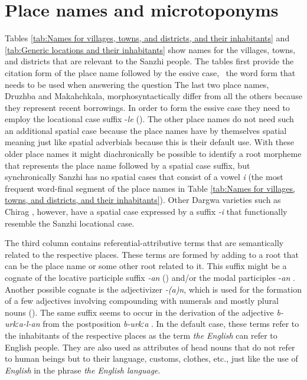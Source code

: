 \chapter{Place names and microtoponyms}
\label{cpt:morph-placenames}

Tables \ref{tab:Names for villages, towns, and districts, and their inhabitants} and \ref{tab:Generic locations and their inhabitants} show names for the villages, towns, and districts that are relevant to the Sanzhi people. The tables first provide the citation form of the place name followed by the essive case, \tie\ the word form that needs to be used when answering the question  The last two place names, Druzhba and Makahchkala, morphosyntactically differ from all the others because they represent recent borrowings. In order to form the essive case they need to employ the locational case suffix -\textit{le} (). The other place names do not need such an additional spatial case because the place names have by themselves spatial meaning just like spatial adverbials because this is their default use. With these older place names it might diachronically be possible to identify a root morpheme that represents the place name followed by a spatial case suffix, but synchronically Sanzhi has no spatial cases that consist of a vowel \textit{i} (the most frequent word-final segment of the place names in Table \ref{tab:Names for villages, towns, and districts, and their inhabitants}).  Other Dargwa varieties such as Chirag \citep{GanenkovChiragSketch}, however, have a spatial case expressed by a suffix \textit{-i} that functionally resemble the Sanzhi locational case.

The third column contains referential-attributive terms that are semantically related to the respective places. These terms are formed by adding  to a root that can be the place name or some other root related to it. This suffix might be a cognate of the locative participle suffix \textit{-an} () and/or the modal participles -\textit{an} . Another possible cognate is the adjectivizer \textit{-(a)n}, which is used for the formation of a few adjectives involving compounding with numerals and mostly plural nouns (). The same suffix seems to occur in the derivation of the adjective \textit{b-urkːa-l-an}  from the postposition \textit{b-urkːa} . In the default case, these terms refer to the inhabitants of the respective places as the term \textit{the English} can refer to English people. They are also used as attributes of head nouns that do not refer to human beings but to their language, customs, clothes, etc., just like the use of \textit{English} in the phrase \textit{the English language}.

